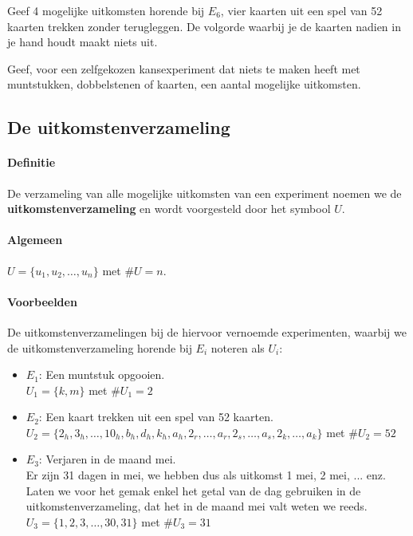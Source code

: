 \documentclass[12pt,twoside]{article}
\begin{document}
\begin{oefening}
Geef 4 mogelijke uitkomsten horende bij $E_6$, vier kaarten uit een spel van 52 kaarten trekken zonder terugleggen. De volgorde waarbij je de kaarten nadien in je hand houdt maakt niets uit.
\end{oefening}

\begin{oefening}
Geef, voor een zelfgekozen kansexperiment dat niets te maken heeft met muntstukken, dobbelstenen of kaarten, een aantal mogelijke uitkomsten.
\end{oefening}

\subsection{De uitkomstenverzameling}

\paragraph*{Definitie}
De verzameling van alle mogelijke uitkomsten van een experiment noemen we de
{\bf uitkomstenverzameling} en wordt voorgesteld door het symbool $U$.

\paragraph*{Algemeen}
$U=\{u_1, u_2, \ldots, u_n\}$ met $\#U=n$.

\paragraph*{Voorbeelden} De uitkomstenverzamelingen bij de hiervoor vernoemde experimenten, waarbij we de uitkomstenverzameling horende bij $E_i$ noteren als $U_i$:
\begin{itemize}
  \item $E_1$: Een muntstuk opgooien.\\
  $U_1 = \{k,m\}$ met $\#U_1=2$
  \item $E_2$: Een kaart trekken uit een spel van 52 kaarten.\\
  $U_2 = \{2_h, 3_h, \ldots , 10_h, b_h, d_h, k_h, a_h, 2_r, \ldots, a_r, 2_s, \ldots, a_s, 2_k, \ldots, a_k \}$ met $\#U_2=52$
  \item $E_3$: Verjaren in de maand mei.\\
  Er zijn 31 dagen in mei, we hebben dus als uitkomst 1 mei, 2 mei, ... enz. Laten we voor het gemak enkel het getal van de dag gebruiken in de uitkomstenverzameling, dat het in de maand mei valt weten we reeds.\\
  $U_3 = \{1, 2, 3, \ldots, 30, 31\}$ met $\#U_3=31$
\end{itemize}
\end{document}
